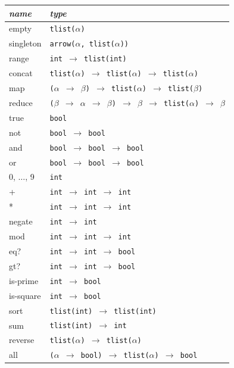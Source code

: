 \documentclass{article}
\begin{document}
\begin{table}
\centering
\begin{tabular}{| l | l |}
  \hline
  \emph{name} & \emph{type} \\
  \hline
    empty & \texttt{tlist($\alpha$)} \\
    singleton & \texttt{arrow($\alpha$, tlist($\alpha$))} \\
    range & \texttt{int $\rightarrow$ tlist(int)} \\
    concat & \texttt{tlist($\alpha$) $\rightarrow$ tlist($\alpha$) $\rightarrow$ tlist($\alpha$)} \\
    map & \texttt{($\alpha$ $\rightarrow$ $\beta$) $\rightarrow$ tlist($\alpha$) $\rightarrow$ tlist($\beta$)} \\
    reduce & \texttt{($\beta$ $\rightarrow$ $\alpha$ $\rightarrow$ $\beta$) $\rightarrow$ $\beta$ $\rightarrow$ tlist($\alpha$) $\rightarrow$ $\beta$} \\
    \hline
    true & \texttt{bool} \\
    not & \texttt{bool $\rightarrow$ bool} \\
    and & \texttt{bool $\rightarrow$ bool $\rightarrow$ bool} \\
    or & \texttt{bool $\rightarrow$ bool $\rightarrow$ bool} \\
    \hline
    0, $\ldots$, 9 & \texttt{int} \\
    + & \texttt{int $\rightarrow$ int $\rightarrow$ int} \\
    * & \texttt{int $\rightarrow$ int $\rightarrow$ int} \\
    negate & \texttt{int $\rightarrow$ int} \\
    mod & \texttt{int $\rightarrow$ int $\rightarrow$ int} \\
    eq? & \texttt{int $\rightarrow$ int $\rightarrow$ bool} \\
    gt? & \texttt{int $\rightarrow$ int $\rightarrow$ bool} \\
    is-prime & \texttt{int $\rightarrow$ bool} \\
    is-square & \texttt{int $\rightarrow$ bool} \\
    sort & \texttt{tlist(int) $\rightarrow$ tlist(int)} \\
    \hline
    sum & \texttt{tlist(int) $\rightarrow$ int} \\
    reverse & \texttt{tlist($\alpha$) $\rightarrow$ tlist($\alpha$)} \\
    all & \texttt{($\alpha$ $\rightarrow$ bool) $\rightarrow$ tlist($\alpha$) $\rightarrow$ bool} \\

\end{tabular}
\end{table}
\end{document}
